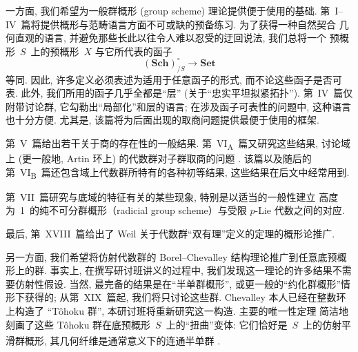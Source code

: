 一方面, 我们希望为一般群概形 (group scheme) 理论提供便于使用的基础.
第~I--IV~篇将提供概形与范畴语言方面不可或缺的预备练习. 为了获得一种自然契合
几何直观的语言, 并避免那些长此以往令人难以忍受的迂回说法, 我们总将一个
预概形~$S$~上的预概形~$X$ 与它所代表的函子
\[
  (\mathbf{Sch})_{/S}^{\circ}\longrightarrow \mathbf{Set}
\]
等同.
因此, 许多定义必须表述为适用于任意函子的形式, 而不论这些函子是否可表.
此外, 我们所用的函子几乎全都是“层” (关于“忠实平坦拟紧拓扑”).
第~IV~篇仅附带讨论群, 它勾勒出“局部化”和层的语言; 在涉及函子可表性的问题中,
这种语言也十分方便. 尤其是, 该篇将为后面出现的取商问题提供最便于使用的框架.

第~V~篇给出若干关于商的存在性的一般结果. 第~VI\textsubscript{A}~篇又研究这些结果,
讨论域上 (更一般地, Artin 环上) 的代数群对子群取商的问题
.
该篇以及随后的第~VI\textsubscript{B}~篇还包含域上代数群所特有的各种初等结果,
这些结果在后文中经常用到.

第~VII~篇研究与底域的特征有关的某些现象, 特别是以适当的一般性建立
高度为~1~的纯不可分群概形（radicial group scheme）与受限 $p$-Lie 代数之间的对应.

最后, 第~XVIII~篇给出了 Weil 关于代数群“双有理”定义的定理的概形论推广.

另一方面, 我们希望将仿射代数群的 Borel--Chevalley 结构理论推广到任意底预概形上的群.
事实上, 在撰写研讨班讲义的过程中, 我们发现这一理论的许多结果不需要仿射性假设.
当然, 最完备的结果是在“半单群概形”, 或更一般的“约化群概形”情形下获得的;
从第~XIX~篇起, 我们将只讨论这些群. Chevalley 本人已经在整数环上构造了
“T\^ohoku 群”, 本研讨班将重新研究这一构造. 主要的唯一性定理
简洁地刻画了这些 T\^ohoku 群在底预概形~$S$~上的“扭曲”变体:
它们恰好是~$S$~上的仿射平滑群概形, 其几何纤维是通常意义下的连通半单群
%
\textsuperscript{}.

